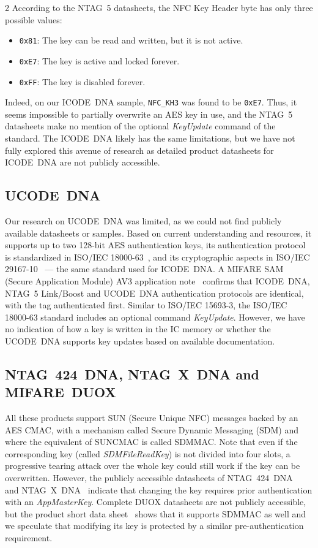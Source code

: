 \documentclass[10pt,letterpaper]{article}
\begin{document}
\begin{multicols}{2}
According to the NTAG~5 datasheets, the NFC Key Header byte has only three possible values:
\begin{itemize}
    \item{\texttt{0x81}: The key can be read and written, but it is not active.}
    \item{\texttt{0xE7}: The key is active and locked forever.}
    \item{\texttt{0xFF}: The key is disabled forever.}
\end{itemize}
Indeed, on our ICODE~DNA sample, \texttt{NFC\_KH3} was found to be \texttt{0xE7}.
Thus, it seems impossible to partially overwrite an AES key in use, and the NTAG~5 datasheets make no mention of the optional \emph{KeyUpdate} command of the standard. The ICODE~DNA likely has the same limitations, but we have not fully explored this avenue of research as detailed product datasheets for ICODE~DNA are not publicly accessible.

\subsection{UCODE~DNA}
\label{sec:ucode}
Our research on UCODE~DNA was limited, as we could not find publicly available datasheets or samples.
Based on current understanding and resources, it supports up to two 128-bit AES authentication keys, its authentication protocol is standardized in ISO/IEC 18000-63~\cite{iso_18000_63}, and its cryptographic aspects in ISO/IEC 29167-10~\cite{iso_29167_10} --- the same standard used for ICODE~DNA. A MIFARE SAM (Secure Application Module) AV3 application note~\cite{nxp_an12698} confirms that ICODE~DNA, NTAG~5 Link/Boost and UCODE~DNA authentication protocols are identical, with the tag authenticated first.
Similar to ISO/IEC 15693-3, the ISO/IEC 18000-63 standard includes an optional command \emph{KeyUpdate}.
However, we have no indication of how a key is written in the IC memory or whether the UCODE~DNA supports key updates based on available documentation.

\subsection{NTAG~424~DNA, NTAG~X~DNA and MIFARE~DUOX}
\label{sec:424}

All these products support SUN (Secure Unique NFC) messages backed by an AES CMAC, with a mechanism called Secure Dynamic Messaging (SDM) and where the equivalent of SUNCMAC is called SDMMAC. Note that even if the corresponding key (called \emph{SDMFileReadKey}) is not divided into four slots, a progressive tearing attack over the whole key could still work if the key can be overwritten. However, the publicly accessible datasheets of NTAG~424~DNA~\cite{nt4h2421gx_3r0_2019} and NTAG~X~DNA~\cite{ntagxdna_3r0_2025} indicate that changing the key requires prior authentication with an \emph{AppMasterKey}.
Complete DUOX datasheets are not publicly accessible, but the product short data sheet~\cite{mf3ex3_sds_1r1_2025} shows that it supports SDMMAC as well and we speculate that modifying its key is protected by a similar pre-authentication requirement.


\end{multicols}
\end{document}
